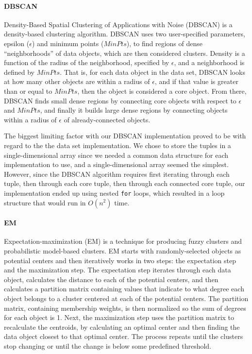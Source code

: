 \documentclass[11pt,letterpaper]{article}
\begin{document}
\paragraph{DBSCAN} Density-Based Spatial Clustering of Applications with Noise (DBSCAN) is a density-based clustering algorithm. DBSCAN uses two user-specified parameters, epsilon ($\epsilon$) and minimum points ($MinPts$), to find regions of dense ``neighborhoods'' of data objects, which are then considered clusters.  Density is a function of the radius of the neighborhood, specified by $\epsilon$, and a neighborhood is defined by $MinPts$.  That is, for each data object in the data set, DBSCAN looks at how many other objects are within a radius of $\epsilon$, and if that value is greater than or equal to $MinPts$, then the object is considered a core object.  From there, DBSCAN finds small dense regions by connecting core objects with respect to $\epsilon$ and $MinPts$, and finally it builds large dense regions by connecting objects within a radius of $\epsilon$ of already-connected objects.

The biggest limiting factor with our DBSCAN implementation proved to be with regard to the the data set implementation.  We chose to store the tuples in a single-dimensional array since we needed a common data structure for each implementation to use, and a single-dimensional array seemed the simplest.  However, since the DBSCAN algorithm requires first iterating through each tuple, then through each core tuple, then through each connected core tuple, our implementation ended up using nested \verb+for+ loops, which resulted in a loop structure that would run in $O(n^2)$ time.

\paragraph{EM} Expectation-maximization (EM) is a technique for producing fuzzy clusters and probabilistic model-based clusters.  EM starts with randomly-selected objects as potential centers and then iteratively works in two steps:  the expectation step and the maximization step.  The expectation step iterates through each data object, calculates the distance to each of the potential centers, and then calculates a partition matrix containing values that indicate to what degree each object belongs to a cluster centered at each of the potential centers.  The partition matrix, containing membership weights, is then normalized so the sum of degrees for each object is 1.  Next, the maximization step uses the partition matrix to recalculate the centroids, by calculating an optimal center and then finding the data object closest to that optimal center.  The process repeats until the clusters stop changing or until the change is below some predefined threshold.
\end{document}
